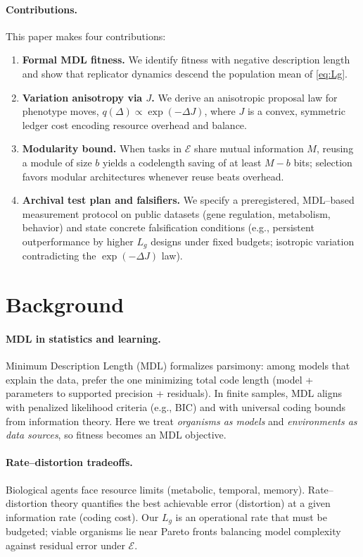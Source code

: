 \documentclass[11pt,a4paper]{article}
\begin{document}
\paragraph{Contributions.}
This paper makes four contributions:
\begin{enumerate}
  \item \textbf{Formal MDL fitness.} We identify fitness with negative description length and show that replicator dynamics descend the population mean of \eqref{eq:Lg}.
  \item \textbf{Variation anisotropy via $J$.} We derive an anisotropic proposal law for phenotype moves, $q(\Delta)\propto \exp(-\Delta J)$, where $J$ is a convex, symmetric ledger cost encoding resource overhead and balance.
  \item \textbf{Modularity bound.} When tasks in $\mathcal{E}$ share mutual information $M$, reusing a module of size $b$ yields a codelength saving of at least $M-b$ bits; selection favors modular architectures whenever reuse beats overhead.
  \item \textbf{Archival test plan and falsifiers.} We specify a preregistered, MDL–based measurement protocol on public datasets (gene regulation, metabolism, behavior) and state concrete falsification conditions (e.g., persistent outperformance by higher $L_g$ designs under fixed budgets; isotropic variation contradicting the $\exp(-\Delta J)$ law).
\end{enumerate}


\section{Background}

\paragraph{MDL in statistics and learning.}
Minimum Description Length (MDL) formalizes parsimony: among models that explain the data, prefer the one minimizing total code length (model + parameters to supported precision + residuals). In finite samples, MDL aligns with penalized likelihood criteria (e.g., BIC) and with universal coding bounds from information theory. Here we treat \emph{organisms as models} and \emph{environments as data sources}, so fitness becomes an MDL objective.

\paragraph{Rate–distortion tradeoffs.}
Biological agents face resource limits (metabolic, temporal, memory). Rate–distortion theory quantifies the best achievable error (distortion) at a given information rate (coding cost). Our $L_g$ is an operational rate that must be budgeted; viable organisms lie near Pareto fronts balancing model complexity against residual error under $\mathcal{E}$.
\end{document}
